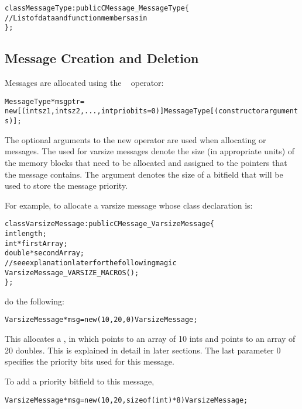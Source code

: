 \begin{alltt}
 class MessageType : public CMessage_MessageType \{
    // List of data and function members as in \CC
 \};
\end{alltt}


\subsection{Message Creation and Deletion}
\label{memory allocation}

Messages are allocated using the \CC\  operator:

\begin{alltt}
 MessageType *msgptr =
  new [(int sz1, int sz2, ... , int priobits=0)] MessageType[(constructor arguments)];
\end{alltt}

The optional arguments to the new operator are used when allocating
 or  messages. The  used for
varsize messages denote the size (in
appropriate units) of the memory blocks that need to be allocated and assigned
to the pointers that the message contains. The  argument denotes
the size of a bitfield that will be used to store the message priority.   

For example, to allocate a varsize message whose 
class declaration is:

\begin{alltt}
class VarsizeMessage : public CMessage_VarsizeMessage \{
  int length;
  int *firstArray;
  double *secondArray;
  // see explanation later for the following magic
  VarsizeMessage_VARSIZE_MACROS();
\};
\end{alltt}

do the following:

\begin{alltt}
VarsizeMessage *msg = new (10, 20, 0) VarsizeMessage;
\end{alltt}

This allocates a , in which  points to an
array of 10 ints and  points to an array of 20 doubles.  This
is explained in detail in later sections. The last parameter 0 specifies
the priority bits used for this message.

To add a priority bitfield to this message, 

\begin{alltt}
VarsizeMessage *msg = new (10, 20, sizeof(int)*8) VarsizeMessage;
\end{alltt}

